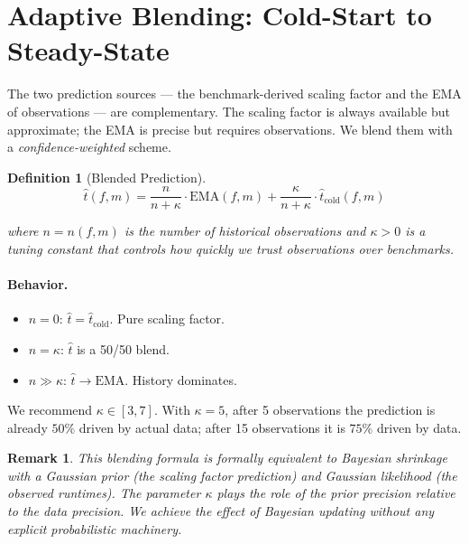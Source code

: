 \documentclass[11pt, a4paper]{article}
\newcommand{\bluecontentbegin}{\begingroup\color{blue!70!black}}
\newcommand{\bluecontentend}{\endgroup}
\newtheorem{definition}{Definition}
\newtheorem{remark}{Remark}
\begin{document}
\section{Adaptive Blending: Cold-Start to Steady-State}
\label{sec:blending}
\bluecontentbegin

The two prediction sources --- the benchmark-derived scaling factor and the
EMA of observations --- are complementary. The scaling factor is always
available but approximate; the EMA is precise but requires observations. We
blend them with a \emph{confidence-weighted} scheme.

\begin{definition}[Blended Prediction]
\label{def:blended}
\begin{equation}
\label{eq:blended}
    \boxed{\;
    \hat{t}(f, m) = \frac{n}{n + \kappa} \cdot \mathrm{EMA}(f, m)
                   + \frac{\kappa}{n + \kappa} \cdot \hat{t}_{\mathrm{cold}}(f, m)
    \;}
\end{equation}

where $n = n(f, m)$ is the number of historical observations and
$\kappa > 0$ is a tuning constant that controls how quickly we trust
observations over benchmarks.
\end{definition}

\paragraph{Behavior.}
\begin{itemize}
    \item $n = 0$: $\hat{t} = \hat{t}_{\mathrm{cold}}$. Pure scaling factor.
    \item $n = \kappa$: $\hat{t}$ is a 50/50 blend.
    \item $n \gg \kappa$: $\hat{t} \to \mathrm{EMA}$. History dominates.
\end{itemize}

We recommend $\kappa \in [3, 7]$. With $\kappa = 5$, after 5 observations the
prediction is already $50\%$ driven by actual data; after 15 observations it is
$75\%$ driven by data.

\begin{remark}
This blending formula is formally equivalent to Bayesian shrinkage with a
Gaussian prior (the scaling factor prediction) and Gaussian likelihood (the
observed runtimes). The parameter $\kappa$ plays the role of the prior
precision relative to the data precision. We achieve the effect of Bayesian
updating without any explicit probabilistic machinery.
\end{remark}
\bluecontentend
\end{document}
